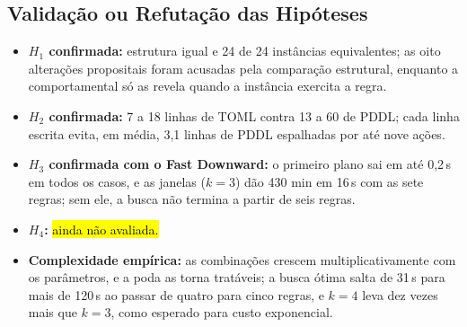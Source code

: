 \documentclass[11pt,a4paper]{article}
\newcommand{\pendente}[1]{\hl{#1}}
\begin{document}
\begin{table}[ht]
\centering
\caption{Regras acumuladas: instanciação e busca (custo do turno em minutos e tempo; limite de 120\,s). A última linha acrescenta as três regras usadas no teste de equivalência.}
\label{tab:acumuladas}
\small
{}
\end{table}

\subsection{Validação ou Refutação das Hipóteses}
\begin{itemize}
    \item \textbf{$H_1$ confirmada:} estrutura igual e 24 de 24 instâncias equivalentes; as oito alterações propositais foram acusadas pela comparação estrutural, enquanto a comportamental só as revela quando a instância exercita a regra.
    \item \textbf{$H_2$ confirmada:} 7 a 18 linhas de TOML contra 13 a 60 de PDDL; cada linha escrita evita, em média, 3,1 linhas de PDDL espalhadas por até nove ações.
    \item \textbf{$H_3$ confirmada com o Fast Downward:} o primeiro plano sai em até 0,2\,s em todos os casos, e as janelas ($k=3$) dão 430 min em 16\,s com as sete regras; sem ele, a busca não termina a partir de seis regras.
    \item \textbf{$H_4$:} \pendente{ainda não avaliada.}
    \item \textbf{Complexidade empírica:} as combinações crescem multiplicativamente com os parâmetros, e a poda as torna tratáveis; a busca ótima salta de 31\,s para mais de 120\,s ao passar de quatro para cinco regras, e $k=4$ leva dez vezes mais que $k=3$, como esperado para custo exponencial.
\end{itemize}
\end{document}
